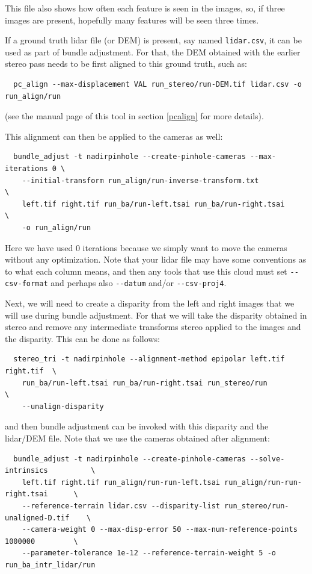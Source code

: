 This file also shows how often each feature is seen in the images, so, if three
images are present, hopefully many features will be seen three times. 

If a ground truth lidar file (or DEM) is present, say named \texttt{lidar.csv}, it can be used
as part of bundle adjustment. For that, the DEM obtained with the earlier
stereo pass needs to be first aligned to this ground truth, such as:

\begin{verbatim}
  pc_align --max-displacement VAL run_stereo/run-DEM.tif lidar.csv -o run_align/run 
\end{verbatim}

(see the manual page of this tool in section \ref{pcalign} for more details). 

This alignment can then be applied to the cameras as well:

\begin{verbatim}
  bundle_adjust -t nadirpinhole --create-pinhole-cameras --max-iterations 0 \
    --initial-transform run_align/run-inverse-transform.txt                 \
    left.tif right.tif run_ba/run-left.tsai run_ba/run-right.tsai           \
    -o run_align/run
\end{verbatim}

Here we have used 0 iterations because we simply want to move the cameras
without any optimization. Note that your lidar file may have some conventions as to what each column
means, and then any tools that use this cloud must set \texttt{-\/-csv-format}
and perhaps also \texttt{-\/-datum} and/or \texttt{-\/-csv-proj4}. 

Next, we will need to create a disparity from the left and right images
that we will use during bundle adjustment. For that we will take the disparity obtained
in stereo and remove any intermediate transforms stereo applied to the
images and the disparity. This can be done as follows:

\begin{verbatim}
  stereo_tri -t nadirpinhole --alignment-method epipolar left.tif right.tif  \
    run_ba/run-left.tsai run_ba/run-right.tsai run_stereo/run                \
    --unalign-disparity 
\end{verbatim}

and then bundle adjustment can be invoked with this disparity and
the lidar/DEM file. Note that we use the cameras obtained after alignment:

\begin{verbatim}
  bundle_adjust -t nadirpinhole --create-pinhole-cameras --solve-intrinsics          \
    left.tif right.tif run_align/run-run-left.tsai run_align/run-run-right.tsai      \
    --reference-terrain lidar.csv --disparity-list run_stereo/run-unaligned-D.tif    \
    --camera-weight 0 --max-disp-error 50 --max-num-reference-points 1000000         \
    --parameter-tolerance 1e-12 --reference-terrain-weight 5 -o run_ba_intr_lidar/run
\end{verbatim}

